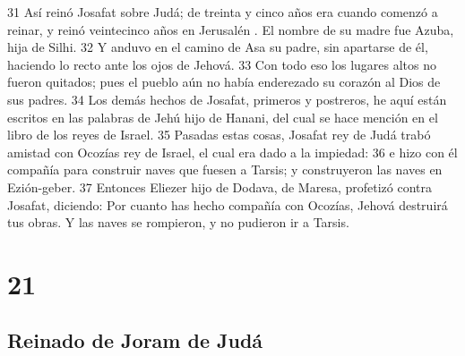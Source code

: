  
31 Así reinó Josafat sobre Judá; de treinta y cinco años era cuando comenzó a reinar, y reinó veintecinco años en Jerusalén . El nombre de su madre fue Azuba, hija de Silhi.
32 Y anduvo en el camino de Asa su padre, sin apartarse de él, haciendo lo recto ante los ojos de Jehová.
33 Con todo eso los lugares altos no fueron quitados; pues el pueblo aún no había enderezado su corazón al Dios de sus padres.
34 Los demás hechos de Josafat, primeros y postreros, he aquí están escritos en las palabras de Jehú hijo de Hanani, del cual se hace mención en el libro de los reyes de Israel.
35 Pasadas estas cosas, Josafat rey de Judá trabó amistad con Ocozías rey de Israel, el cual era dado a la impiedad:
36 e hizo con él compañía para construir naves que fuesen a Tarsis; y construyeron las naves en Ezión-geber.
37 Entonces Eliezer hijo de Dodava, de Maresa, profetizó contra Josafat, diciendo: Por cuanto has hecho compañía con Ocozías, Jehová destruirá tus obras. Y las naves se rompieron, y no pudieron ir a Tarsis.

\chapter{21}

\section*{Reinado de Joram de Judá}

 

